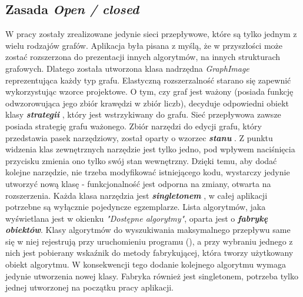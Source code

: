 \subsection{Zasada \textit{Open / closed}}
W pracy zostały zrealizowane jedynie sieci przepływowe, które są tylko jednym z wielu rodzajów grafów. Aplikacja była pisana z myślą, że w przyszłości może zostać rozszerzona do prezentacji innych algorytmów, na innych strukturach grafowych. Dlatego została utworzona klasa nadrzędna \emph{GraphImage} reprezentująca każdy typ grafu. Elastyczną rozszerzalność starano się zapewnić wykorzystując wzorce projektowe. O tym, czy graf jest ważony (posiada funkcję odwzorowująca jego zbiór krawędzi w zbiór liczb), decyduje odpowiedni obiekt klasy \textbf{\textit{strategii}} \cite{id:WzorceProjektoweStrategia}, który jest wstrzykiwany do grafu. Sieć przepływowa zawsze posiada strategię grafu ważonego. Zbiór narzędzi do edycji grafu, który przedstawia pasek narzędziowy, został oparty o wzorzec \textbf{\textit{stanu}} \cite{id:WzorceProjektoweStan}. Z punktu widzenia klas zewnętrznych narzędzie jest tylko jedno, pod wpływem naciśnięcia przycisku zmienia ono tylko swój stan wewnętrzny. Dzięki temu, aby dodać kolejne narzędzie, nie trzeba modyfikować istniejącego kodu, wystarczy jedynie utworzyć nową klasę - funkcjonalność jest odporna na zmiany, otwarta na rozszerzenia. Każda klasa narzędzia jest \textbf{\textit{singletonem}} \cite{id:WzorceCppSingleton}, w całej aplikacji potrzebne są wyłącznie pojedyncze egzemplarze. Lista algorytmów, jaka wyświetlana jest w okienku \textit{"Dostępne algorytmy"}, oparta  jest o \textbf{\textit{fabrykę obiektów}}. Klasy algorytmów do wyszukiwania maksymalnego przepływu same się w niej rejestrują przy uruchomieniu programu (\cite{id:WzorceCppFabryka}), a przy wybraniu jednego z nich jest pobierany wskaźnik do metody fabrykującej, która tworzy użytkowany obiekt algorytmu. W konsekwencji tego dodanie kolejnego algorytmu wymaga jedynie utworzenia nowej klasy. Fabryka również jest singletonem, potrzeba tylko jednej utworzonej na początku pracy aplikacji.
